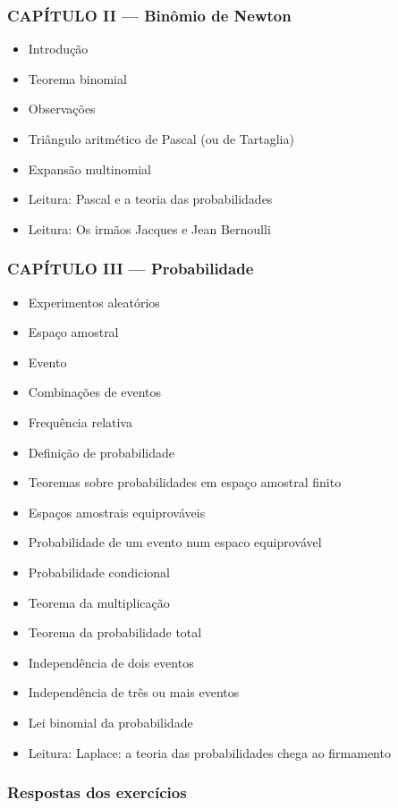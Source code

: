 \documentclass[a4paper,12pt]{article}[abntex2]
\begin{document}
\subsubsection*{CAPÍTULO II — Binômio de Newton}

\begin{itemize}
\item Introdução
\item Teorema binomial
\item Observações
\item Triângulo aritmético de Pascal (ou de Tartaglia)
\item Expansão multinomial
\item Leitura: Pascal e a teoria das probabilidades
\item Leitura: Os irmãos Jacques e Jean Bernoulli
\end{itemize}
\subsubsection*{CAPÍTULO III — Probabilidade}

\begin{itemize}
\item Experimentos aleatórios
\item Espaço amostral
\item Evento
\item Combinações de eventos
\item Frequência relativa
\item Definição de probabilidade
\item Teoremas sobre probabilidades em espaço amostral finito
\item Espaços amostrais equiprováveis
\item Probabilidade de um evento num espaco equiprovável
\item Probabilidade condicional
\item Teorema da multiplicação
\item Teorema da probabilidade total
\item Independência de dois eventos
\item Independência de três ou mais eventos
\item Lei binomial da probabilidade
\item Leitura: Laplace: a teoria das probabilidades chega ao firmamento
\end{itemize}
\subsubsection*{Respostas dos exercícios}
\end{document}
